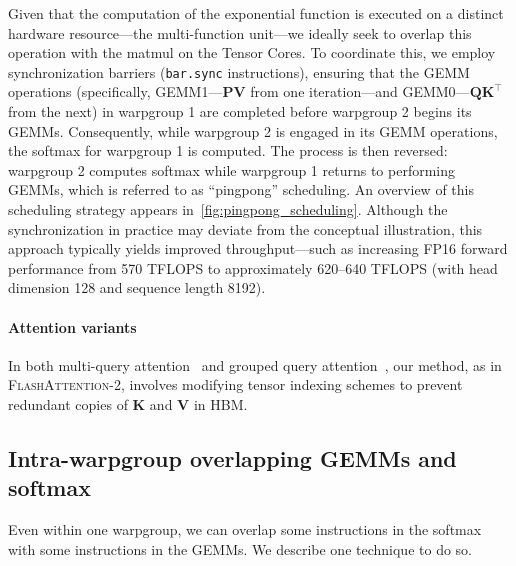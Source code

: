 \begin{enumerate}
Given that the computation of the exponential function is executed on a distinct hardware resource—the multi-function unit—we ideally seek to overlap this operation with the matmul on the Tensor Cores. To coordinate this, we employ synchronization barriers (\texttt{bar.sync} instructions), ensuring that the GEMM operations (specifically, GEMM1—$\mathbf{P} \mathbf{V}$ from one iteration—and GEMM0—$\mathbf{Q} \mathbf{K}^\top$ from the next) in warpgroup 1 are completed before warpgroup 2 begins its GEMMs. Consequently, while warpgroup 2 is engaged in its GEMM operations, the softmax for warpgroup 1 is computed. The process is then reversed: warpgroup 2 computes softmax while warpgroup 1 returns to performing GEMMs, which is referred to as “pingpong” scheduling. An overview of this scheduling strategy appears in~\cref{fig:pingpong_scheduling}. Although the synchronization in practice may deviate from the conceptual illustration, this approach typically yields improved throughput—such as increasing FP16 forward performance from 570 TFLOPS to approximately 620–640 TFLOPS (with head dimension 128 and sequence length 8192).

\paragraph{Attention variants} In both multi-query attention~\citep{shazeer2019fast} and grouped query attention~\citep{ainslie2023gqa}, our method, as in \textsc{FlashAttention-2}, involves modifying tensor indexing schemes to prevent redundant copies of $\mathbf{K}$ and $\mathbf{V}$ in HBM.

\subsection{Intra-warpgroup overlapping GEMMs and softmax}

Even within one warpgroup, we can overlap some instructions in the softmax with some instructions in the GEMMs. We describe one technique to do so.


\end{enumerate}
